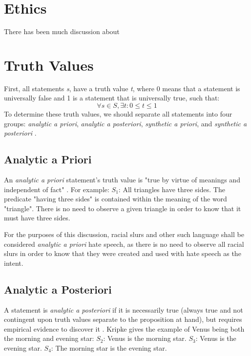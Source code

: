 \section{Ethics}
There has been much discussion about 









\section{Truth Values}
First, all statements \textit{s}, have a truth value \textit{t}, where 0 means that a statement is universally false and 1 is a statement that is universally true, such that:
\begin{equation}
\forall s \in S,\exists t : 0 \leq t \leq 1 
\end{equation}
To determine these truth values, we should separate all statements into four groups: \textit{analytic a priori}, \textit{analytic a posteriori}, \textit{synthetic a priori}, and \textit{synthetic a posteriori} \citep{wright1997companion}.
\subsection{Analytic a Priori}
An \textit{analytic a priori} statement's truth value is "true by virtue of meanings and independent of fact" \citep{quine1951main}. 
For example: $S_1$: All triangles have three sides.
The predicate "having three sides" is contained within the meaning of the word "triangle". There is no need to observe a given triangle in order to know that it must have three sides.

For the purposes of this discussion, racial slurs and other such language shall be considered \textit{analytic a priori} hate speech, as there is no need to observe all racial slurs in order to know that they were created and used with hate speech as the intent.

\subsection{Analytic a Posteriori}
A statement is \textit{analytic a posteriori} if it is necessarily true (always true and not contingent upon truth values separate to the proposition at hand), but requires empirical evidence to discover it \citep{kripke1972naming}. Kripke gives the example of Venus being both the morning and evening star: 
$S_2$: Venus is the morning star.
$S_3$: Venus is the evening star.
$S_4$: The morning star is the evening star.

